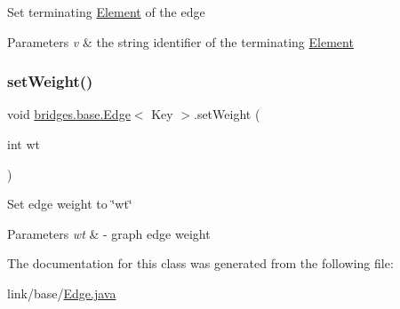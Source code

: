 Set terminating \hyperlink{classbridges_1_1base_1_1_element}{Element} of the edge


\begin{DoxyParams}{Parameters}
{\em v} & the string identifier of the terminating \hyperlink{classbridges_1_1base_1_1_element}{Element} \\
\hline
\end{DoxyParams}
\hypertarget{classbridges_1_1base_1_1_edge_a5b671fc2589d95b125b0b2cedbab0f1a}{}\label{classbridges_1_1base_1_1_edge_a5b671fc2589d95b125b0b2cedbab0f1a} 
\subsubsection{\texorpdfstring{set\+Weight()}{setWeight()}}
{\footnotesize\ttfamily void \hyperlink{classbridges_1_1base_1_1_edge}{bridges.\+base.\+Edge}$<$ Key $>$.set\+Weight (\begin{DoxyParamCaption}\item[{int}]{wt }\end{DoxyParamCaption})}

Set edge weight to \char`\"{}wt\char`\"{}


\begin{DoxyParams}{Parameters}
{\em wt} & -\/ graph edge weight \\
\hline
\end{DoxyParams}


The documentation for this class was generated from the following file\+:\begin{DoxyCompactItemize}
\item 
link/base/\hyperlink{_edge_8java}{Edge.\+java}\end{DoxyCompactItemize}
